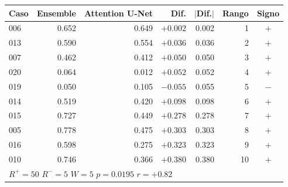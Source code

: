 \begin{tabular}{lrrrrrc}
\toprule
Caso & Ensemble & Attention U-Net & Dif. & $|$Dif.$|$ & Rango & Signo \\
\midrule
006 & 0.652 & 0.649 & $+0.002$ & 0.002 & 1 & $+$ \\
013 & 0.590 & 0.554 & $+0.036$ & 0.036 & 2 & $+$ \\
007 & 0.462 & 0.412 & $+0.050$ & 0.050 & 3 & $+$ \\
020 & 0.064 & 0.012 & $+0.052$ & 0.052 & 4 & $+$ \\
019 & 0.050 & 0.105 & $-0.055$ & 0.055 & 5 & $-$ \\
014 & 0.519 & 0.420 & $+0.098$ & 0.098 & 6 & $+$ \\
015 & 0.727 & 0.449 & $+0.278$ & 0.278 & 7 & $+$ \\
005 & 0.778 & 0.475 & $+0.303$ & 0.303 & 8 & $+$ \\
016 & 0.598 & 0.275 & $+0.323$ & 0.323 & 9 & $+$ \\
010 & 0.746 & 0.366 & $+0.380$ & 0.380 & 10 & $+$ \\
\midrule
\multicolumn{7}{l}{$R^+ = 50$ \quad $R^- = 5$ \quad $W = 5$ \quad $p = 0.0195$ \quad $r = +0.82$} \\
\bottomrule
\end{tabular}%